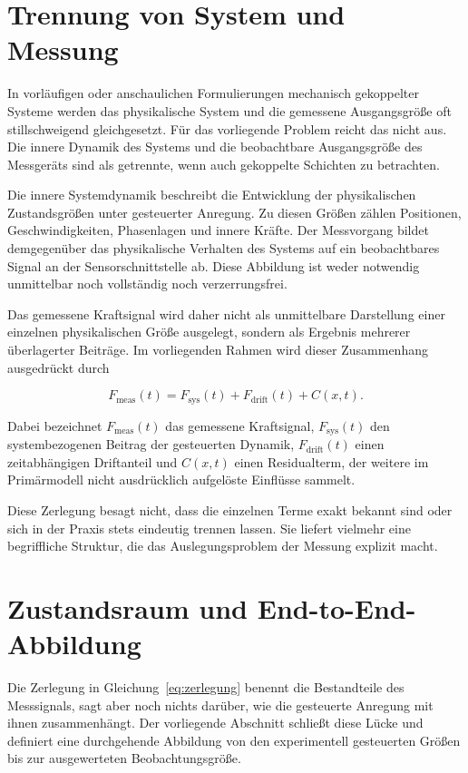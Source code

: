 \documentclass[12pt,a4paper]{report}
\begin{document}
\section{Trennung von System und Messung}

In vorläufigen oder anschaulichen Formulierungen mechanisch gekoppelter
Systeme werden das physikalische System und die gemessene Ausgangsgröße
oft stillschweigend gleichgesetzt. Für das vorliegende Problem reicht das
nicht aus. Die innere Dynamik des Systems und die beobachtbare
Ausgangsgröße des Messgeräts sind als getrennte, wenn auch gekoppelte
Schichten zu betrachten.

Die innere Systemdynamik beschreibt die Entwicklung der physikalischen
Zustandsgrößen unter gesteuerter Anregung. Zu diesen Größen zählen
Positionen, Geschwindigkeiten, Phasenlagen und innere Kräfte. Der
Messvorgang bildet demgegenüber das physikalische Verhalten des Systems
auf ein beobachtbares Signal an der Sensorschnittstelle ab. Diese
Abbildung ist weder notwendig unmittelbar noch vollständig noch
verzerrungsfrei.

Das gemessene Kraftsignal wird daher nicht als unmittelbare Darstellung
einer einzelnen physikalischen Größe ausgelegt, sondern als Ergebnis
mehrerer überlagerter Beiträge. Im vorliegenden Rahmen wird dieser
Zusammenhang ausgedrückt durch

\begin{equation}
F_{\text{meas}}(t) = F_{\text{sys}}(t) + F_{\text{drift}}(t) + C(x,t).
\label{eq:zerlegung}
\end{equation}

Dabei bezeichnet $F_{\text{meas}}(t)$ das gemessene Kraftsignal,
$F_{\text{sys}}(t)$ den systembezogenen Beitrag der gesteuerten Dynamik,
$F_{\text{drift}}(t)$ einen zeitabhängigen Driftanteil und $C(x,t)$ einen
Residualterm, der weitere im Primärmodell nicht ausdrücklich aufgelöste
Einflüsse sammelt.

Diese Zerlegung besagt nicht, dass die einzelnen Terme exakt bekannt sind
oder sich in der Praxis stets eindeutig trennen lassen. Sie liefert
vielmehr eine begriffliche Struktur, die das Auslegungsproblem der
Messung explizit macht.

\section{Zustandsraum und End-to-End-Abbildung}
\label{sec:endtoend}

Die Zerlegung in Gleichung~\eqref{eq:zerlegung} benennt die Bestandteile
des Messsignals, sagt aber noch nichts darüber, wie die gesteuerte
Anregung mit ihnen zusammenhängt. Der vorliegende Abschnitt schließt
diese Lücke und definiert eine durchgehende Abbildung von den
experimentell gesteuerten Größen bis zur ausgewerteten Beobachtungsgröße.
\end{document}
